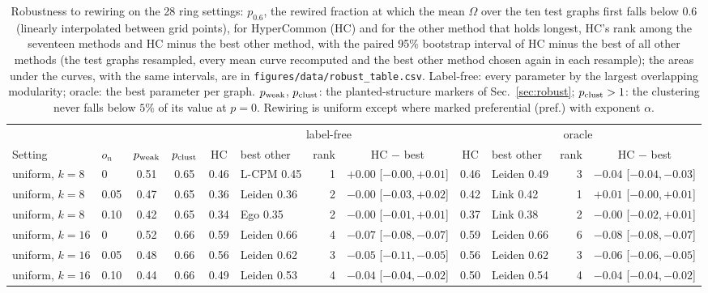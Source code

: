 \begin{table}[p]
\caption{Robustness to rewiring on the 28 ring settings: $p_{0.6}$, the rewired fraction at which the mean $\Omega$ over the ten test graphs first falls below $0.6$ (linearly interpolated between grid points), for HyperCommon (HC) and for the other method that holds longest, HC's rank among the seventeen methods and HC minus the best other method, with the paired 95\% bootstrap interval of HC minus the best of all other methods (the test graphs resampled, every mean curve recomputed and the best other method chosen again in each resample); the areas under the curves, with the same intervals, are in \texttt{figures/data/robust\_table.csv}. Label-free: every parameter by the largest overlapping modularity; oracle: the best parameter per graph. $p_{\rm weak}$, $p_{\rm clust}$: the planted-structure markers of Sec.~\ref{sec:robust}; $p_{\rm clust}>1$: the clustering never falls below $5\%$ of its value at $p=0$. Rewiring is uniform except where marked preferential (pref.) with exponent $\alpha$.}
\label{tab:S-robust}
\scriptsize\setlength{\tabcolsep}{2pt}
\begin{ruledtabular}
\begin{tabular}{llcc|cl r c|cl r c}
 & & & & \multicolumn{4}{c|}{label-free} & \multicolumn{4}{c}{oracle} \\
Setting & $o_n$ & $p_{\rm weak}$ & $p_{\rm clust}$ & HC & best other & rank & HC $-$ best & HC & best other & rank & HC $-$ best \\
\hline
uniform, $k=8$ & 0 & 0.51 & 0.65 & 0.46 & L-CPM 0.45 & 1 & $+0.00$ [$-0.00,+0.01$] & 0.46 & Leiden 0.49 & 3 & $-0.04$ [$-0.04,-0.03$] \\
uniform, $k=8$ & 0.05 & 0.47 & 0.65 & 0.36 & Leiden 0.36 & 2 & $-0.00$ [$-0.03,+0.02$] & 0.42 & Link 0.42 & 1 & $+0.01$ [$-0.00,+0.01$] \\
uniform, $k=8$ & 0.10 & 0.42 & 0.65 & 0.34 & Ego 0.35 & 2 & $-0.00$ [$-0.01,+0.01$] & 0.37 & Link 0.38 & 2 & $-0.00$ [$-0.02,+0.01$] \\
uniform, $k=16$ & 0 & 0.52 & 0.66 & 0.59 & Leiden 0.66 & 4 & $-0.07$ [$-0.08,-0.07$] & 0.59 & Leiden 0.66 & 6 & $-0.08$ [$-0.08,-0.07$] \\
uniform, $k=16$ & 0.05 & 0.48 & 0.66 & 0.56 & Leiden 0.62 & 3 & $-0.05$ [$-0.11,-0.05$] & 0.56 & Leiden 0.62 & 3 & $-0.06$ [$-0.06,-0.05$] \\
uniform, $k=16$ & 0.10 & 0.44 & 0.66 & 0.49 & Leiden 0.53 & 4 & $-0.04$ [$-0.04,-0.02$] & 0.50 & Leiden 0.54 & 4 & $-0.04$ [$-0.04,-0.02$] \\

\end{tabular}
\end{ruledtabular}
\end{table}
